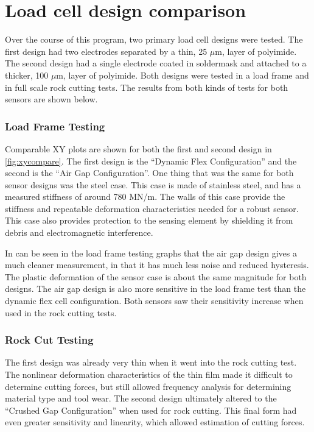 \chapter{Load cell design comparison
\label{chap:8}}

Over the course of this program, two primary load cell designs were tested.
The first design had two electrodes separated by a thin, 25 $\mu$m, layer of polyimide.
The second design had a single electrode coated in soldermask 
and attached to a thicker, 100 $\mu$m, layer of polyimide.
Both designs were tested in a load frame and in full scale rock cutting tests.
The results from both kinds of tests for both sensors are shown below.

\subsection{Load Frame Testing}

Comparable XY plots are shown for both the first and second design
in \ref{fig:xycompare}. The first design is the ``Dynamic Flex Configuration'' 
and the second is the ``Air Gap Configuration''.
One thing that was the same for both sensor designs was the steel case. This case
is made of stainless steel, and has a measured stiffness of around 780 MN/m. 
The walls of this case provide the stiffness and repeatable deformation characteristics
needed for a robust sensor. This case also provides protection to the sensing element by
shielding it from debris and electromagnetic interference.

In can be seen in the load frame testing graphs that the air gap design
gives a much cleaner measurement, in that it has much less noise and reduced hysteresis.
The plastic deformation of the sensor case is about the same magnitude for both designs.
The air gap design is also more sensitive in the load frame test than the dynamic flex cell configuration.
Both sensors saw their sensitivity increase when used in the rock cutting tests.

\subsection{Rock Cut Testing}

The first design was already very thin when it went into the rock cutting test.
The nonlinear deformation characteristics of the thin film made it difficult to determine
cutting forces, but still allowed frequency analysis for determining material type and tool wear.
The second design ultimately altered to the ``Crushed Gap Configuration'' when used for rock cutting.
This final form had even greater sensitivity and linearity, which allowed estimation of cutting forces.


